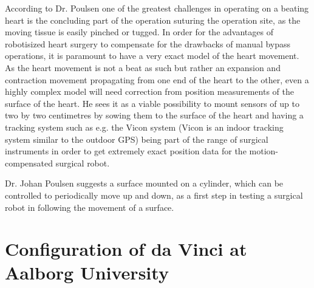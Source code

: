 According to Dr. Poulsen one of the greatest challenges in operating on a beating heart is the concluding part of the operation suturing the operation site, as the moving tissue is easily pinched or tugged. 
In order for the advantages of robotisized heart surgery to compensate for the drawbacks of manual bypass operations, it is paramount to have a very exact model of the heart movement. 
As the heart movement is not a beat as such but rather an expansion and contraction movement propagating from one end of the heart to the other, even a highly complex model will need correction from position measurements of the surface of the heart. 
He sees it as a viable possibility to mount sensors of up to two by two centimetres by sowing them to the surface of the heart and having a tracking system such as e.g. the Vicon system (Vicon is an indoor  tracking system similar to the outdoor GPS) being part of the range of surgical instruments in order to get extremely exact position data for the motion-compensated surgical robot.


Dr. Johan Poulsen suggests a surface mounted on a cylinder, which can be controlled to periodically move up and down, as a first step in testing a surgical robot in following the movement of a surface.








%
%
%

\vspace{-2mm}
\section{Configuration of da Vinci at Aalborg University}\label{sec:technical_overview}

